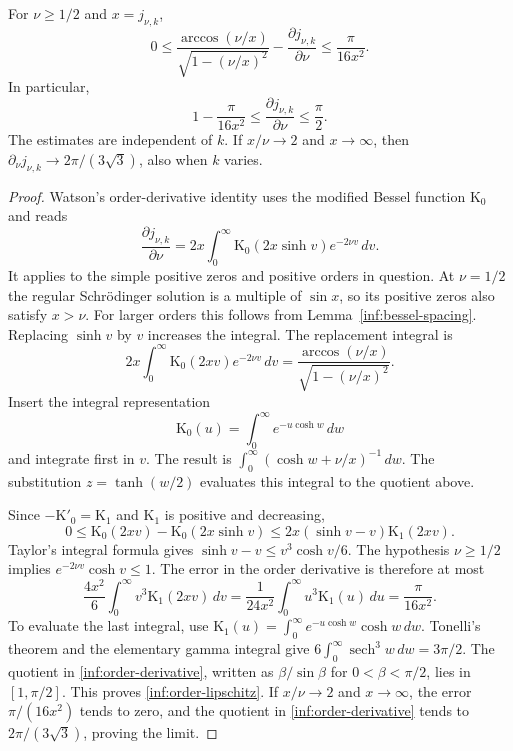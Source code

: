 \begin{lemma}\label{inf:bessel-order}
For $\nu\ge1/2$ and $x=j_{\nu,k}$,
\begin{equation}\label{inf:order-derivative}
 0\le \frac{\arccos(\nu/x)}{\sqrt{1-(\nu/x)^2}}
       -\frac{\partial j_{\nu,k}}{\partial\nu}
 \le\frac{\pi}{16x^2}.
\end{equation}
In particular,
\begin{equation}\label{inf:order-lipschitz}
 1-\frac\pi{16x^2}\le\frac{\partial j_{\nu,k}}{\partial\nu}
 \le\frac\pi2.
\end{equation}
The estimates are independent of $k$. If $x/\nu\to2$ and
$x\to\infty$, then
$\partial_\nu j_{\nu,k}\to2\pi/(3\sqrt3)$, also when $k$ varies.
\end{lemma}
\begin{proof}
Watson's order-derivative identity uses the modified Bessel function
$\mathrm K_0$ and reads
\[
 \frac{\partial j_{\nu,k}}{\partial\nu}
 =2x\int_0^\infty \mathrm K_0(2x\sinh v)e^{-2\nu v}\,dv.
\]
It applies to the simple positive zeros and positive orders in question.
At $\nu=1/2$ the regular Schr\"odinger solution is a multiple of
$\sin x$, so its positive zeros also satisfy $x>\nu$. For larger
orders this follows from Lemma~\ref{inf:bessel-spacing}.
Replacing $\sinh v$ by $v$ increases the integral. The replacement
integral is
\[
 2x\int_0^\infty \mathrm K_0(2xv)e^{-2\nu v}\,dv
 =\frac{\arccos(\nu/x)}{\sqrt{1-(\nu/x)^2}}.
\]
Insert the integral representation
\[
 \mathrm K_0(u)=\int_0^\infty e^{-u\cosh w}\,dw
\]
and integrate first in $v$. The result is
$\int_0^\infty(\cosh w+\nu/x)^{-1}\,dw$.
The substitution $z=\tanh(w/2)$ evaluates this integral to the
quotient above.

Since $-\mathrm K'_0=\mathrm K_1$ and $\mathrm K_1$ is positive and decreasing,
\[
 0\le \mathrm K_0(2xv)-\mathrm K_0(2x\sinh v)
 \le2x(\sinh v-v)\mathrm K_1(2xv).
\]
Taylor's integral formula gives $\sinh v-v\le v^3\cosh v/6$.
The hypothesis $\nu\ge1/2$ implies
$e^{-2\nu v}\cosh v\le1$. The error in the order derivative is
therefore at most
\[
 \frac{4x^2}{6}\int_0^\infty v^3\mathrm K_1(2xv)\,dv
 =\frac1{24x^2}\int_0^\infty u^3\mathrm K_1(u)\,du
 =\frac\pi{16x^2}.
\]
To evaluate the last integral, use
$\mathrm K_1(u)=\int_0^\infty e^{-u\cosh w}\cosh w\,dw$.
Tonelli's theorem and the elementary gamma integral give
$6\int_0^\infty\operatorname{sech}^3w\,dw=3\pi/2$.
The quotient in \eqref{inf:order-derivative}, written as
$\beta/\sin\beta$ for $0<\beta<\pi/2$, lies in $[1,\pi/2]$.
This proves \eqref{inf:order-lipschitz}. If $x/\nu\to2$ and
$x\to\infty$, the error $\pi/(16x^2)$ tends to zero, and the
quotient in \eqref{inf:order-derivative} tends to
$2\pi/(3\sqrt3)$, proving the limit.
\end{proof}

